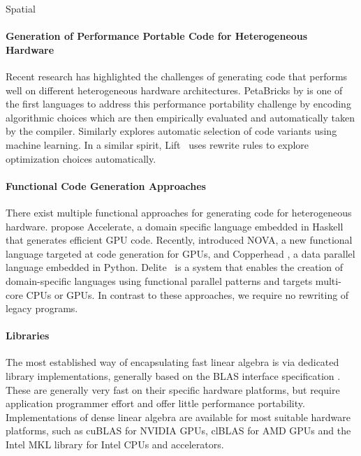     Spatial \citet{Koeplinger:2018:SLC:3192366.3192379}


\paragraph*{Generation of Performance Portable Code for Heterogeneous Hardware}
    Recent research has highlighted the challenges of generating code that
    performs well on different heterogeneous hardware architectures.
    PetaBricks by \citet{PhothilimthanaARA13} is one of the first languages to
    address this performance portability challenge by encoding algorithmic
    choices which are then empirically evaluated and automatically taken by the
    compiler.
    Similarly \cite{MuralidharanRHG16} explores automatic selection of code
    variants using machine learning.
    In a similar spirit, Lift~\cite{steuwer15rewrite} uses rewrite rules to
    explore optimization choices automatically.

\paragraph*{Functional Code Generation Approaches}
    There exist multiple functional approaches for generating code for
    heterogeneous hardware.
    \citet{chakravarty11accelerating,mcdonell13optimising} propose Accelerate,
    a domain specific language embedded in Haskell that generates efficient GPU
    code.
    Recently, \citet{collins14nova} introduced NOVA, a new functional language
    targeted at code generation for GPUs, and Copperhead
    \cite{catanzaro11copperhead}, a data parallel language embedded in Python.
    Delite~\cite{brown11heterogeneous,chafi11domain} is a system that enables
    the creation of domain-specific languages using functional parallel patterns
    and targets multi-core CPUs or GPUs.
    In contrast to these approaches, we require no rewriting of legacy programs.

\paragraph*{Libraries}
    The most established way of encapsulating fast linear algebra is via
    dedicated library implementations, generally based on the BLAS interface
    specification \cite{2002:USB:567806.567807}.
    These are generally very fast on their specific hardware platforms, but
    require application programmer effort and offer little performance portability.
    Implementations of dense linear algebra are available for most suitable
    hardware platforms, such as cuBLAS \cite{cublas} for NVIDIA GPUs, clBLAS
    \cite{clblas} for AMD GPUs and the Intel MKL library \cite{mkl} for Intel
    CPUs and accelerators.


